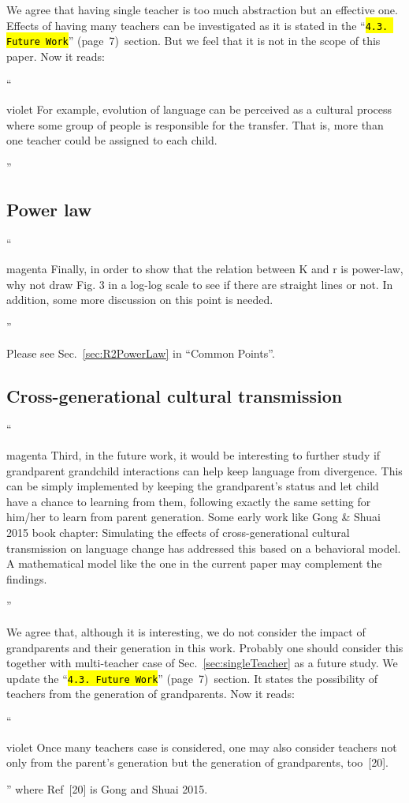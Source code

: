 \documentclass[10.5pt]{amsart}
\newcommand{\refsec}[1]{Sec.~\ref{#1}}
\newcommand{\hbRoRCommonPoints}{``Common Points''}
\newcommand{\hbColorReviewer}{magenta}
\newcommand{\hbColorManuscript}{violet}
\newenvironment{hbReviewer}
	{\list{}{\leftmargin=2cm\rightmargin=1cm}\item[]``\begin{footnotesize}
	\begin{color}{\hbColorReviewer}}	
	{\end{color}\end{footnotesize}''\endlist}
\newcommand{\hbMRefP}[2]{``\texttt{{\color{\hbColorManuscript}\hl{#1}}}''  (page~#2)}
\newenvironment{hbChanged}
	{\list{}{\leftmargin=1cm\rightmargin=1.5cm}\item[]``\begin{small}
	\begin{color}{\hbColorManuscript}}	
	{\end{color}\end{small}''\endlist}
\newcommand{\hbMFutureWork}{\hbMRefP{4.3. Future Work}{7}}
\begin{document}
We agree that having single teacher is too much abstraction but an effective one.
Effects of having many teachers can be investigated as 
it is stated in the \hbMFutureWork\ section.
But we feel that it is not in the scope of this paper.
Now it reads:
\begin{hbChanged}
	For example,
	evolution of language can be perceived as a cultural process
	where some group of people is responsible for the transfer.
	That is, more than one teacher could be assigned to each child.
\end{hbChanged}




\subsection{Power law}
	\label{sec:BPowerLaw}

\begin{hbReviewer}
	Finally, in order to show that the relation between K and r is power-law, 
	why not draw Fig. 3 in a log-log scale to see 
	if there are straight lines or not. In addition, 
	some more discussion on this point is needed. 
\end{hbReviewer}

Please see \refsec{sec:R2PowerLaw} in \hbRoRCommonPoints.




\subsection{Cross-generational cultural transmission}
\begin{hbReviewer}
	Third, in the future work, 
	it would be interesting to further study 
	if grandparent grandchild interactions can help keep language 
	from divergence. 
	This can be simply implemented by keeping the grandparent's status 
	and let child have a chance to learning from them, 
	following exactly the same setting for him/her to learn 
	from parent generation. 
	Some early work like 
	Gong \& Shuai 2015 book chapter: 
	Simulating the effects of cross-generational cultural transmission 
	on language change 
	has addressed this based on a behavioral model. 
	A mathematical model like the one in the current paper 
	may complement the findings. 
\end{hbReviewer}

We agree that,
although it is interesting,
we do not consider the impact of grandparents and their generation in this work.
Probably one should consider this together with 
multi-teacher case of \refsec{sec:singleTeacher} as a future study.
We update the \hbMFutureWork\ section. 
It states the possibility of teachers from the generation of grandparents.
Now it reads:
\begin{hbChanged}
	Once many teachers case is considered,
	one may also consider teachers not only from the parent's generation but 
	the generation of grandparents, too~[20].
\end{hbChanged}
where Ref~[20] is Gong and Shuai 2015.
\end{document}
